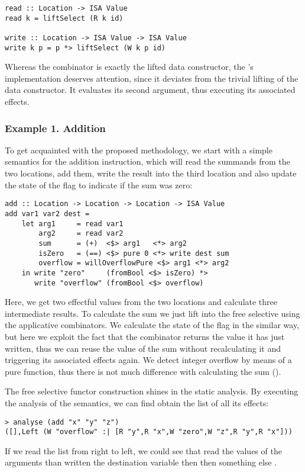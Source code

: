 \begin{verbatim}
read :: Location -> ISA Value
read k = liftSelect (R k id)

write :: Location -> ISA Value -> ISA Value
write k p = p *> liftSelect (W k p id)
\end{verbatim}

Whereas the  combinator is exactly the lifted  data constructor, the 's implementation deserves attention, since it deviates from the trivial lifting of
the  data constructor. It evaluates its second argument, thus executing its
associated effects.

\subsubsection{Example 1. Addition}

To get acquainted with the proposed methodology, we start with a simple semantics for
the addition instruction, which will read the summands from the two locations, add them,
write the result into the third location and also update the state of the 
flag to indicate if the sum was zero:

\begin{verbatim}
add :: Location -> Location -> Location -> ISA Value
add var1 var2 dest =
    let arg1     = read var1
        arg2     = read var2
        sum      = (+)  <$> arg1   <*> arg2
        isZero   = (==) <$> pure 0 <*> write dest sum
        overflow = willOverflowPure <$> arg1 <*> arg2
    in write "zero"     (fromBool <$> isZero) *>
       write "overflow" (fromBool <$> overflow)
\end{verbatim}

Here, we get two effectful values from the two locations and calculate three intermediate
results. To calculate the sum we just lift \hs{+} into the free selective using the applicative
combinators. We calculate the state of the  flag in the similar way, but here we
exploit the fact that the  combinator returns the value it has just written, thus we
can reuse the value of the sum without recalculating it and triggering its associated effects
again. We detect integer overflow by means of a pure function, thus there is not much difference
with calculating the sum ().

The free selective functor construction shines in the static analysis. By executing
the analysis of the  semantics, we can find obtain the list of all its effects:
\begin{verbatim}
> analyse (add "x" "y" "z")
([],Left (W "overflow" :| [R "y",R "x",W "zero",W "z",R "y",R "x"]))
\end{verbatim}
If we read the list from right to left, we could see that  read the values of the
arguments than written the destination variable then then something else .

